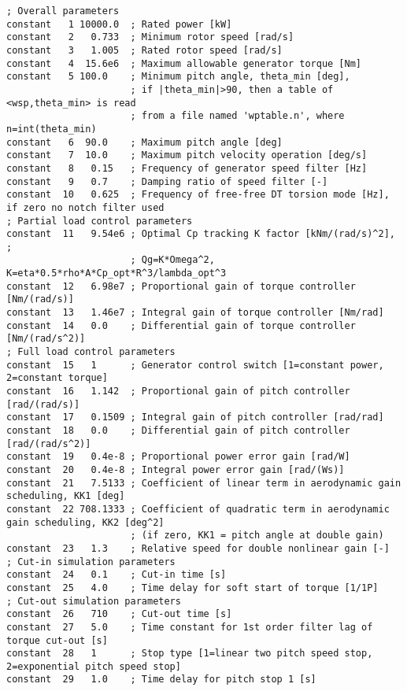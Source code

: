 \begin{table}[b]
\begin{center}
\scriptsize
\begin{verbatim}
; Overall parameters
constant   1 10000.0  ; Rated power [kW]
constant   2   0.733  ; Minimum rotor speed [rad/s]
constant   3   1.005  ; Rated rotor speed [rad/s]
constant   4  15.6e6  ; Maximum allowable generator torque [Nm]
constant   5 100.0    ; Minimum pitch angle, theta_min [deg],
                      ; if |theta_min|>90, then a table of <wsp,theta_min> is read
                      ; from a file named 'wptable.n', where n=int(theta_min)
constant   6  90.0    ; Maximum pitch angle [deg]
constant   7  10.0    ; Maximum pitch velocity operation [deg/s]
constant   8   0.15   ; Frequency of generator speed filter [Hz]
constant   9   0.7    ; Damping ratio of speed filter [-]
constant  10   0.625  ; Frequency of free-free DT torsion mode [Hz], if zero no notch filter used
; Partial load control parameters
constant  11   9.54e6 ; Optimal Cp tracking K factor [kNm/(rad/s)^2], ;
                      ; Qg=K*Omega^2, K=eta*0.5*rho*A*Cp_opt*R^3/lambda_opt^3
constant  12   6.98e7 ; Proportional gain of torque controller [Nm/(rad/s)]
constant  13   1.46e7 ; Integral gain of torque controller [Nm/rad]
constant  14   0.0    ; Differential gain of torque controller [Nm/(rad/s^2)]
; Full load control parameters
constant  15   1      ; Generator control switch [1=constant power, 2=constant torque]
constant  16   1.142  ; Proportional gain of pitch controller [rad/(rad/s)]
constant  17   0.1509 ; Integral gain of pitch controller [rad/rad]
constant  18   0.0    ; Differential gain of pitch controller [rad/(rad/s^2)]
constant  19   0.4e-8 ; Proportional power error gain [rad/W]
constant  20   0.4e-8 ; Integral power error gain [rad/(Ws)]
constant  21   7.5133 ; Coefficient of linear term in aerodynamic gain scheduling, KK1 [deg]
constant  22 708.1333 ; Coefficient of quadratic term in aerodynamic gain scheduling, KK2 [deg^2]
                      ; (if zero, KK1 = pitch angle at double gain)
constant  23   1.3    ; Relative speed for double nonlinear gain [-]
; Cut-in simulation parameters
constant  24   0.1    ; Cut-in time [s]
constant  25   4.0    ; Time delay for soft start of torque [1/1P]
; Cut-out simulation parameters
constant  26   710    ; Cut-out time [s]
constant  27   5.0    ; Time constant for 1st order filter lag of torque cut-out [s]
constant  28   1      ; Stop type [1=linear two pitch speed stop, 2=exponential pitch speed stop]
constant  29   1.0    ; Time delay for pitch stop 1 [s]

\end{verbatim}
\end{center}
\end{table}
